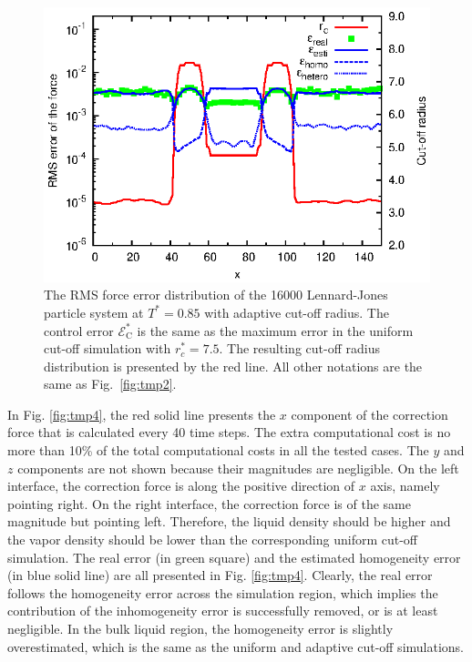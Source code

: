 \documentclass[aps, pre, preprint]{revtex4}
\begin{document}
\begin{figure}
  \centering
  \includegraphics[]{rcut.and.error.eps}
  \caption{ The RMS force error distribution of the 16000
    Lennard-Jones particle system at $T^\ast=0.85$ with adaptive
    cut-off radius. The control error $\mathcal E^\ast_{\textrm{C}}$
    is the same as the maximum error in the uniform cut-off simulation
    with $r_c^\ast=7.5$.  The resulting cut-off radius distribution is
    presented by the red line. All other notations are the same as
    Fig.~\ref{fig:tmp2}.}
  \label{fig:tmp3}
\end{figure}


In Fig. \ref{fig:tmp4}, the red solid line presents the $x$ component
of the 
correction force that is calculated every 40 time steps.
The extra computational cost is no more than 10\% of the total
computational costs in all the tested cases.
The $y$ and
$z$ components are not shown because their magnitudes are negligible.
On the left interface, the correction force is along the positive
direction of $x$ axis, namely pointing right.  On the right interface,
the correction force is of the same magnitude but pointing
left. Therefore, the liquid density should be higher and the vapor
density should be lower than the corresponding uniform cut-off
simulation.  The real error (in green square) and the estimated
homogeneity error (in blue solid line) are all presented in
Fig. \ref{fig:tmp4}.  Clearly, the real error follows the homogeneity
error across the simulation region, which implies the contribution of
the inhomogeneity error is successfully removed, or is at least
negligible. In the bulk liquid region, the homogeneity error is
slightly overestimated, which is the same as the uniform and adaptive
cut-off simulations.
\end{document}
